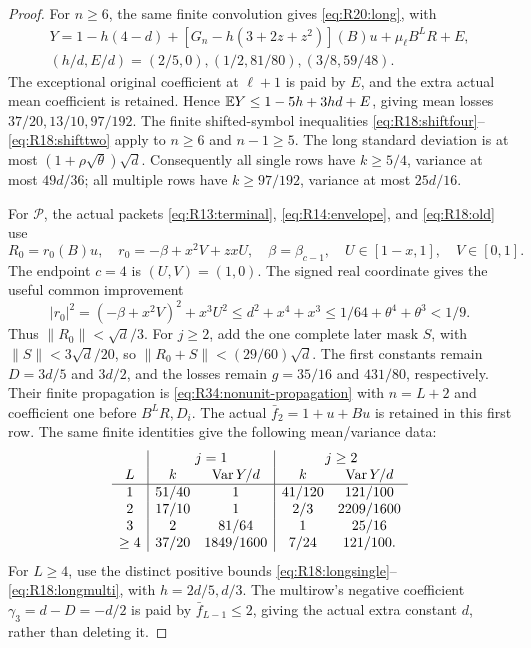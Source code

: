 \begin{proof}
For \(n\ge6\), the same finite convolution gives
\eqref{eq:R20:long}, with
\[
\begin{gathered}
 Y=1-h(4-d)+[G_n-h(3+2z+z^2)](B)u+\mu_\ell B^LR+E,\\
 (h/d,E/d)=(2/5,0),(1/2,81/80),(3/8,59/48).
\end{gathered}
\]
The exceptional original coefficient at \(\ell+1\) is paid by
\(E\), and the extra actual mean coefficient is retained. Hence
\(\mathbb E Y\le1-5h+3hd+E\), giving mean losses
\(37/20,13/10,97/192\). The finite shifted-symbol inequalities
\eqref{eq:R18:shiftfour}--\eqref{eq:R18:shifttwo} apply to
\(n\ge6\) and \(n-1\ge5\). The long standard deviation is at
most \((1+\rho\sqrt\theta)\sqrt d\). Consequently all single
rows have \(k\ge5/4\), variance at most \(49d/36\); all
multiple rows have \(k\ge97/192\), variance at most \(25d/16\).

For \(\mathcal P\), the actual packets
\eqref{eq:R13:terminal}, \eqref{eq:R14:envelope}, and
\eqref{eq:R18:old} use
\[
 R_0=r_0(B)u,\quad r_0=-\beta+x^2V+zxU,\quad
 \beta=\beta_{c-1},\quad U\in[1-x,1],\quad V\in[0,1].
\]
The endpoint \(c=4\) is \((U,V)=(1,0)\).
The signed real coordinate gives the useful common improvement
\[
 |r_0|^2=(-\beta+x^2V)^2+x^3U^2
 \le d^2+x^4+x^3\le1/64+\theta^4+\theta^3<1/9.
\]
Thus \(\|R_0\|<\sqrt d/3\). For \(j\ge2\), add the one
complete later mask \(S\), with \(\|S\|<3\sqrt d/20\), so
\(\|R_0+S\|<(29/60)\sqrt d\).
The first constants remain \(D=3d/5\) and \(3d/2\), and the
losses remain \(g=35/16\) and \(431/80\), respectively.
Their finite propagation is \eqref{eq:R34:nonunit-propagation}
with \(n=L+2\) and coefficient one before \(B^LR,D_i\).
The actual \(\bar f_2=1+u+Bu\) is retained in this first row.
The same finite identities give the following mean/variance data:
\[
\begin{array}{c|cc|cc}
 &\multicolumn{2}{c|}{j=1}&\multicolumn{2}{c}{j\ge2}\\
 L&k&\operatorname{Var}Y/d&k&\operatorname{Var}Y/d\\\hline
1&51/40&1&41/120&121/100\\
2&17/10&1&2/3&2209/1600\\
3&2&81/64&1&25/16\\
\ge4&37/20&1849/1600&7/24&121/100.
\end{array}
\]
For \(L\ge4\), use the distinct positive bounds
\eqref{eq:R18:longsingle}--\eqref{eq:R18:longmulti}, with
\(h=2d/5,d/3\). The multirow's negative coefficient
\(\gamma_3=d-D=-d/2\) is paid by \(\bar f_{L-1}\le2\),
giving the actual extra constant \(d\), rather than deleting it.


\end{proof}
